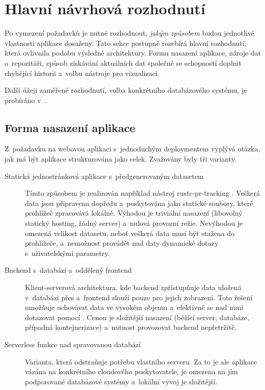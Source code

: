 \section{Hlavní návrhová rozhodnutí}
\label{sec:design:decisions}

Po vymezení požadavků je nutné rozhodnout, \emph{jakým způsobem} budou jednotlivé vlastnosti aplikace dosaženy. Tato sekce postupně rozebírá hlavní rozhodnutí, která ovlivnila podobu výsledné architektury. Formu nasazení aplikace, zdroje dat o~repozitáři, způsob získávání aktuálních dat společně se schopností doplnit chybějící historii a~volbu nástroje pro vizualizaci.

Další úžeji zaměřené rozhodnutí, volba konkrétního databázového systému, je probíráno v~.

\subsection{Forma nasazení aplikace}
\label{subsec:decisions:deployment}

Z~požadavku na webovou aplikaci s~jednoduchým deploymentem vyplývá otázka, jak má být aplikace strukturována jako celek. Zvažovány byly tři varianty.

\begin{description}
  \item[Statická jednostránková aplikace s~předgenerovaným datasetem]
    Tímto způsobem je realizován například nástroj rustc-pr-tracking . Veškerá data jsou připravena dopředu a~poskytována jako statické soubory, které prohlížeč zpracovává lokálně. Výhodou je triviální nasazení (libovolný statický hosting, žádný server) a~nulová provozní režie. Nevýhodou je omezená velikost datasetu, neboť veškerá data musí být stažena do prohlížeče, a~nemožnost provádět nad daty dynamické dotazy s~uživatelskými parametry.

  \item[Backend s~databází a~oddělený frontend]
    Klient-serverová architektura, kde backend zpřístupňuje data uložená v~databázi přes \API a~frontend slouží pouze pro jejich zobrazení. Toto řešení umožňuje uchovávat data ve vysokém objemu a~efektivně se nad nimi dotazovat pomocí \SQL. Cenou je složitější nasazení (běžící server, databáze, případná kontejnerizace) a~nutnost provozovat backend nepřetržitě.

  \item[Serverless funkce nad spravovanou databází]
    Varianta, která odstraňuje potřebu vlastního serveru. Za to je ale aplikace vázána na konkrétního cloudového poskytovatele, je omezena na jím podporované databázové systémy a~lokální vývoj je složitější.
\end{description}

